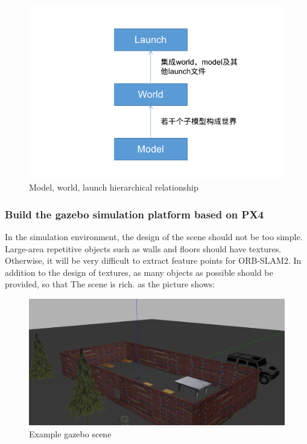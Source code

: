 \documentclass[conference]{IEEEtran}
\begin{document}
\begin{figure}[htbp]
    \centerline{\includegraphics[width=0.95\columnwidth]{ros2.png}}
    \caption{Model, world, launch hierarchical relationship}
\end{figure}

\subsubsection{Build the gazebo simulation platform based on PX4}
In the simulation environment, the design of the scene should not be too simple. Large-area repetitive objects such as walls and floors should have textures. Otherwise, it will be very difficult to extract feature points for ORB-SLAM2. In addition to the design of textures, as many objects as possible should be provided, so that The scene is rich. as the picture shows:

\begin{figure}[htbp]
    \centerline{\includegraphics[width=0.95\columnwidth]{scene1.png}}
    \caption{Example gazebo scene}
\end{figure}
\end{document}

